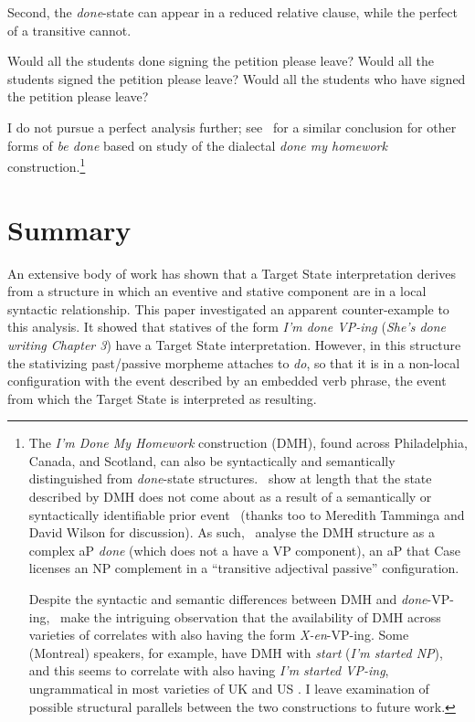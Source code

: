 \documentclass[output=paper,modfonts,nonflat]{langsci/langscibook}
\begin{document}
Second, the \emph{done}-state can appear in a reduced relative clause, while the perfect of a transitive cannot.


\begin{exe}
\ex
\begin{xlist}
\ex Would all the students done signing the petition please leave?
\ex *Would all the students signed the petition please leave?
\ex Would all the students who have signed the petition please leave?
\end{xlist}
\end{exe}

I do not pursue a perfect analysis further; see~\cite{Fruehwald2015a} for a
similar conclusion for other forms of \emph{be done} based on study of the
dialectal \emph{done my homework} construction.\footnote{The \emph{I'm Done My
    Homework} construction (\gls{DMH}), found across
    Philadelphia, Canada, and Scotland, can also be syntactically and
    semantically distinguished from \emph{done}-state
    structures.~\cite{Fruehwald2015a} show at length that the state described
    by \gls{DMH} does not come about as a result of a semantically or
    syntactically identifiable prior event~\citep[154--7]{Fruehwald2015a}
    (thanks too to Meredith Tamminga and David Wilson for discussion). As
    such,~\cite{Fruehwald2015a} analyse the \gls{DMH} structure as a complex aP
    \emph{done} (which does not a have a VP component), an aP that Case
    licenses an NP complement in a \enquote{transitive adjectival passive}
    configuration.

Despite the syntactic and semantic differences between \gls{DMH} and
\emph{done}-VP-ing,~\cite{Fruehwald2015a} make the intriguing observation that
the availability of DMH across varieties of  correlates with also having
the form \emph{X-en}-VP-ing. Some (Montreal) speakers, for example, have DMH
with \emph{start} (\emph{I'm started NP}), and this seems to correlate with
also having \emph{I'm started VP-ing}, ungrammatical in most varieties of UK
and US . I leave examination of possible structural parallels between
the two constructions to future work.}

\section{Summary}\label{summary}

An extensive body of work has shown that a Target State interpretation derives
from a structure in which an eventive and stative component are in a local
syntactic relationship. This paper investigated an apparent counter-example to
this analysis. It showed that statives of the form \emph{I'm done VP-ing}
(\emph{She's done writing Chapter 3}) have a Target State interpretation.
However, in this structure the stativizing past/passive morpheme attaches to
\emph{do}, so that it is in a non-local configuration with the event described
by an embedded verb phrase, the event from which the Target State is
interpreted as resulting.
\end{document}
